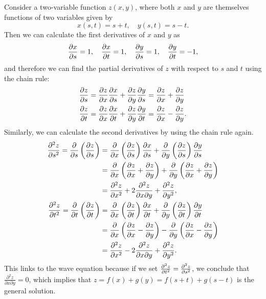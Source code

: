 \documentclass[../multivariate_calculus.tex]{subfiles}
\begin{document}
        \begin{example}\label{ex-chain-rule}
            Consider a two-variable function $z(x,y)$, where both $x$ and $y$ are themselves functions of two variables given by
            \begin{equation}
                x(s,t)=s+t,\quad y(s,t)=s-t.
            \end{equation}
            Then we can calculate the first derivatives of $x$ and $y$ as
            \begin{equation}
                \frac{\partial x}{\partial s}=1,\quad\frac{\partial x}{\partial t}=1,\quad\frac{\partial y}{\partial s}=1,\quad\frac{\partial y}{\partial t}=-1,
            \end{equation}
            and therefore we can find the partial derivatives of $z$ with respect to $s$ and $t$ using the chain rule:
            \begin{align}
                \frac{\partial z}{\partial s}&=\frac{\partial z}{\partial x}\frac{\partial x}{\partial s}+\frac{\partial z}{\partial y}\frac{\partial y}{\partial s}=\frac{\partial z}{\partial x}+\frac{\partial z}{\partial y}\\
                \frac{\partial z}{\partial t}&=\frac{\partial z}{\partial x}\frac{\partial x}{\partial t}+\frac{\partial z}{\partial y}\frac{\partial y}{\partial t}=\frac{\partial z}{\partial x}-\frac{\partial z}{\partial y}.
            \end{align}
            Similarly, we can calculate the second derivatives by using the chain rule again.
            \begin{align}
                \frac{\partial^2{z}}{\partial{s}^2}=\frac{\partial}{\partial s}\left(\frac{\partial z}{\partial s}\right)&=\frac{\partial}{\partial x}\left(\frac{\partial z}{\partial s}\right)\frac{\partial x}{\partial s}+\frac{\partial}{\partial y}\left(\frac{\partial z}{\partial s}\right)\frac{\partial y}{\partial s}\\
                &=\frac{\partial}{\partial x}\left(\frac{\partial z}{\partial x}+\frac{\partial z}{\partial y}\right)+\frac{\partial}{\partial y}\left(\frac{\partial z}{\partial x}+\frac{\partial z}{\partial y}\right)\\
                &=\frac{\partial^2{z}}{\partial{x}^2}+2\frac{\partial^2 z}{\partial x\partial y}+\frac{\partial^2{z}}{\partial{y}^2},\\
                \frac{\partial^2{z}}{\partial{t}^2}=\frac{\partial}{\partial t}\left(\frac{\partial z}{\partial t}\right)&=\frac{\partial}{\partial x}\left(\frac{\partial z}{\partial t}\right)\frac{\partial x}{\partial t}+\frac{\partial}{\partial y}\left(\frac{\partial z}{\partial t}\right)\frac{\partial y}{\partial t}\\
                &=\frac{\partial}{\partial x}\left(\frac{\partial z}{\partial x}-\frac{\partial z}{\partial y}\right)-\frac{\partial}{\partial y}\left(\frac{\partial z}{\partial x}-\frac{\partial z}{\partial y}\right)\\
                &=\frac{\partial^2{z}}{\partial{x}^2}-2\frac{\partial^2 z}{\partial x\partial y}+\frac{\partial^2{z}}{\partial{y}^2}.
            \end{align}
            This links to the wave equation because if we set $\frac{\partial^2{z}}{\partial{t}^2}=\frac{\partial^2{z}}{\partial{s}^2}$, we conclude that $\frac{\partial^2 z}{\partial x\partial y}=0$, which implies that $z=f(x)+g(y)=f(s+t)+g(s-t)$ is the general solution.
        \end{example}
\end{document}

